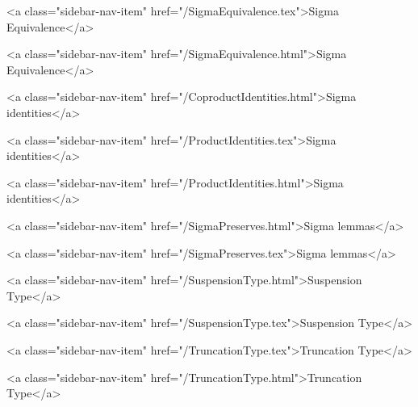       
    
      
        
          <a class="sidebar-nav-item" href="/SigmaEquivalence.tex">Sigma Equivalence</a>
        
      
    
      
        
          <a class="sidebar-nav-item" href="/SigmaEquivalence.html">Sigma Equivalence</a>
        
      
    
      
        
          <a class="sidebar-nav-item" href="/CoproductIdentities.html">Sigma identities</a>
        
      
    
      
        
          <a class="sidebar-nav-item" href="/ProductIdentities.tex">Sigma identities</a>
        
      
    
      
        
          <a class="sidebar-nav-item" href="/ProductIdentities.html">Sigma identities</a>
        
      
    
      
        
          <a class="sidebar-nav-item" href="/SigmaPreserves.html">Sigma lemmas</a>
        
      
    
      
        
          <a class="sidebar-nav-item" href="/SigmaPreserves.tex">Sigma lemmas</a>
        
      
    
      
        
          <a class="sidebar-nav-item" href="/SuspensionType.html">Suspension Type</a>
        
      
    
      
        
          <a class="sidebar-nav-item" href="/SuspensionType.tex">Suspension Type</a>
        
      
    
      
        
          <a class="sidebar-nav-item" href="/TruncationType.tex">Truncation Type</a>
        
      
    
      
        
          <a class="sidebar-nav-item" href="/TruncationType.html">Truncation Type</a>
        
